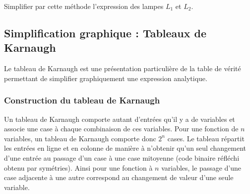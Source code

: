 \documentclass[11pt,oneside]{article}
\begin{document}
\begin{exemple}
Simplifier par cette méthode l'expression des lampes $L_1$ et $L_2$. 
\end{exemple}

\subsection{Simplification graphique : Tableaux de Karnaugh}
Le tableau de Karnaugh est une présentation particulière de la table de vérité permettant de simplifier graphiquement une expression analytique. 

\subsubsection{Construction du tableau de Karnaugh}
Un tableau de Karnaugh comporte autant d'entrées qu'il y a de variables et associe une case à chaque combinaison de ces variables. Pour une fonction de $n$ variables, un tableau de Karnaugh comporte donc $2^n$ cases. Le tableau répartit les entrées en ligne et en colonne de manière à n'obtenir qu'un seul changement d'une entrée au passage d'un case à une case mitoyenne (code binaire réfléchi obtenu par symétries). Ainsi pour une fonction à $n$ variables, le passage d'une case adjacente à une autre correspond au changement de valeur d'une seule variable. 

%
%
%
%
%
\end{document}
